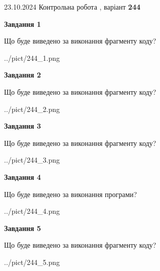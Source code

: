 \documentclass[12pt, ukrainian]{article}
\begin{document}
{\Large{23.10.2024 Контрольна робота , варіант  \No \textbf { 244 }\par}}
{
\begin {large}
{\begin {center}\textbf{Завдання 1}\end {center}}

Що буде виведено за виконання фрагменту коду?\par
\begin{center}
	{../pict/244_1.png}
\end{center}
\newpage

{\begin {center}\textbf{Завдання 2}\end {center}}

Що буде виведено за виконання фрагменту коду?\par
\begin{center}
	{../pict/244_2.png}
\end{center}
\newpage

{\begin {center}\textbf{Завдання 3}\end {center}}

Що буде виведено за виконання фрагменту коду?\par
\begin{center}
	{../pict/244_3.png}
\end{center}
\newpage

{\begin {center}\textbf{Завдання 4}\end {center}}

Що буде виведено за виконання програми?\par
\begin{center}
	{../pict/244_4.png}
\end{center}
\newpage

{\begin {center}\textbf{Завдання 5}\end {center}}

Що буде виведено за виконання фрагменту коду?\par
\begin{center}
	{../pict/244_5.png}
\end{center}
\newpage


\end{large}}
\end{document}

